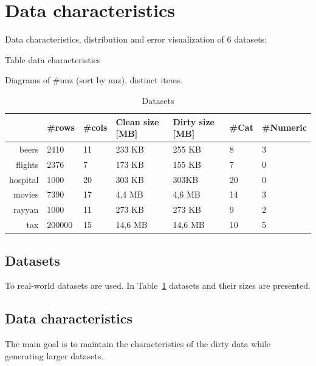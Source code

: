 \section{Data characteristics}

Data characteristics, distribution and error visualization of 6 datasets:

Table data characteristics

Diagrams of \#nnz (sort by nnz), distinct items. 
\begin{table}[!t]
\caption{\label{tab:dataset_sizes}Datasets}
\centering
\begin{tabular}{r|l|l|l|l|l|l}
\toprule
 & \#rows & \#cols & Clean size {[}MB{]} & Dirty size {[}MB{]} & \#Cat & \#Numeric\\
\midrule
beers                & 2410     & 11     &    233 KB              & 255 KB                    & 8                    & 3                    \\
flights              & 2376     & 7      &    173 KB              & 155 KB                    & 7                    & 0                    \\
hospital             & 1000     & 20     &    303 KB              & 303KB                     & 20                   & 0                     \\
movies               & 7390     & 17     &    4,4 MB              & 4,6 MB                    & 14                   & 3                    \\
rayyan               & 1000     & 11     &    273 KB              & 273 KB                    & 9                    & 2                     \\
tax                  & 200000   & 15     &    14,6 MB             & 14,6 MB                   & 10                   & 5                    \\
\bottomrule    
\end{tabular}
\end{table}

\subsection{Datasets}
To real-world datasets are used. In Table~\ref{tab:dataset_sizes} datasets and their sizes are presented.

\subsection{Data characteristics}
The main goal is to maintain the characteristics of the dirty data while generating larger datasets. 

